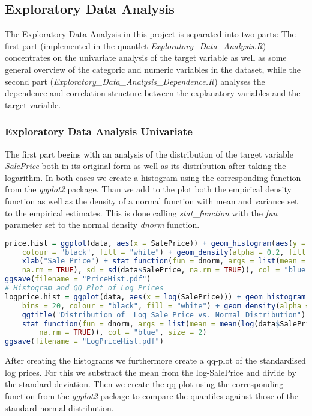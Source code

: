\subsection{Exploratory Data Analysis}
The Exploratory Data Analysis in this project is separated into two parts: The first part (implemented in the quantlet \textit{Exploratory\_Data\_Analysis.R}) concentrates on the univariate analysis of the target variable as well as some general overview of the categoric and numeric variables in the dataset, while the second part (\textit{Exploratory\_Data\_Analysis\_Dependence.R}) analyses the dependence and correlation structure between the explanatory variables and the target variable. 

\subsubsection{Exploratory Data Analysis Univariate}
The first part begins with an analysis of the distribution of the target variable \textit{SalePrice} both in its original form as well as its distribution after taking the logarithm. In both cases we create a histogram using the corresponding function from the \textit{ggplot2} package. Than we add to the plot both the empirical density function as well as the density of a normal function with mean and variance set to the empirical estimates. This is done calling  \textit{stat\_function} with the \textit{fun} parameter set to the normal density \textit{dnorm} function.
\begin{lstlisting}[language=R]
price.hist = ggplot(data, aes(x = SalePrice)) + geom_histogram(aes(y = ..density..), bins = 20, 
    colour = "black", fill = "white") + geom_density(alpha = 0.2, fill = "#FF6666") + ggtitle("Distribution of Sale Price vs. Normal Distribution") + 
    xlab("Sale Price") + stat_function(fun = dnorm, args = list(mean = mean(data$SalePrice, 
    na.rm = TRUE), sd = sd(data$SalePrice, na.rm = TRUE)), col = "blue", size = 2)
ggsave(filename = "PriceHist.pdf")
# Histogram and QQ Plot of Log Prices
logprice.hist = ggplot(data, aes(x = log(SalePrice))) + geom_histogram(aes(y = ..density..), 
    bins = 20, colour = "black", fill = "white") + geom_density(alpha = 0.2, fill = "#FF6666") + 
    ggtitle("Distribution of  Log Sale Price vs. Normal Distribution") + xlab("Log Sale Price") + 
    stat_function(fun = dnorm, args = list(mean = mean(log(data$SalePrice), na.rm = TRUE), sd = sd(log(data$SalePrice), 
        na.rm = TRUE)), col = "blue", size = 2)
ggsave(filename = "LogPriceHist.pdf")
\end{lstlisting}
After creating the histograms we furthermore create a qq-plot of the standardised log prices. For this we substract the mean from the log-SalePrice and divide by the standard deviation. Then we create the qq-plot using the corresponding function from the \textit{ggplot2} package to compare the quantiles against those of the standard normal distribution.

